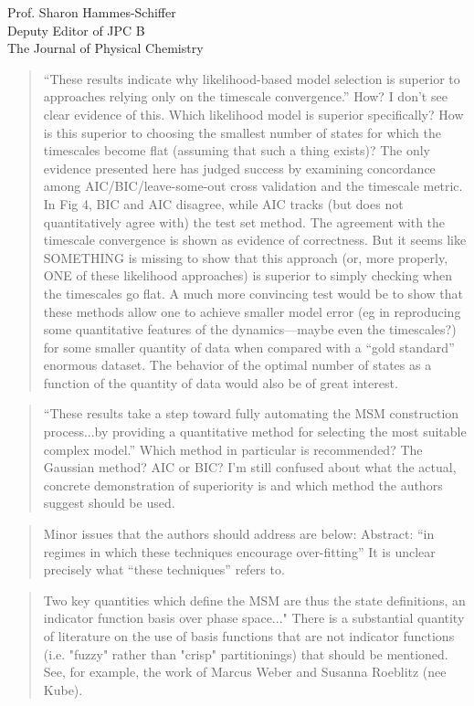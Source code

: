\documentclass{letter}
\begin{document}
\begin{letter}{Prof. Sharon Hammes-Schiffer \\ Deputy Editor of JPC B \\ The Journal of Physical Chemistry}
\begin{quote}
``These results indicate why likelihood-based model selection is superior to approaches relying only on the timescale convergence.''  How?  I don't see clear evidence of this.  Which likelihood model is superior specifically?  How is this superior to choosing the smallest number of states for which the timescales become flat (assuming that such a thing exists)?  The only evidence presented here has judged success by examining concordance among AIC/BIC/leave-some-out cross validation and the timescale metric.  In Fig 4, BIC and AIC disagree, while AIC tracks (but does not quantitatively agree with) the test set method.  The agreement with the timescale convergence is shown as evidence of correctness.  But it seems like SOMETHING is missing to show that this approach (or, more properly, ONE of these likelihood approaches) is superior to simply checking when the timescales go flat.  A much more convincing test would be to show that these methods allow one to achieve smaller model error (eg in reproducing some quantitative features of the dynamics---maybe even the timescales?) for some smaller quantity of data when compared with a ``gold standard'' enormous dataset.  The behavior of the optimal number of states as a function of the quantity of data would also be of great interest.
\end{quote}

\begin{quote}
``These results take a step toward fully automating the MSM construction process...by providing a quantitative method for selecting the most suitable complex model.''  Which method in particular is recommended?  The Gaussian method?  AIC or BIC?  I'm still confused about what the actual, concrete demonstration of superiority is and which method the authors suggest should be used.
\end{quote}

\begin{quote}
Minor issues that the authors should address are below:
Abstract: ``in regimes in which these techniques encourage over-fitting''  It is unclear precisely what ``these techniques'' refers to.
\end{quote}

\begin{quote}
Two key quantities which define the MSM are thus the state definitions, an indicator function basis over phase space..."  There is a substantial quantity of literature on the use of basis functions that are not indicator functions (i.e. "fuzzy" rather than "crisp" partitionings) that should be mentioned.  See, for example, the work of Marcus Weber and Susanna Roeblitz (nee Kube).
\end{quote}


\end{letter}
\end{document}
